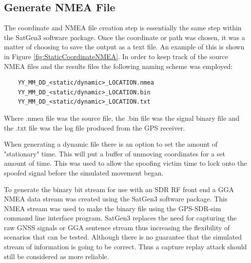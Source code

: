 \subsection{Generate NMEA File} \label{subsec:NMEAFile}
The coordinate and NMEA file creation step is essentially the same step within the SatGen3 software package. Once the coordinate or path was chosen, it was a matter of
choosing to save the output as a text file. An example of this is shown in Figure \ref{fig:StaticCoordinateNMEA}. In order to keep track of the source NMEA files and the
results files the following naming scheme was employed:
\\
\begin{verbatim}
    YY_MM_DD_<static/dynamic>_LOCATION.nmea
    YY_MM_DD_<static/dynamic>_LOCATION.bin
    YY_MM_DD_<static/dynamic>_LOCATION.txt
\end{verbatim}

Where .nmea file was the source file, the .bin file was the signal binary file and the .txt file was the log file produced from the GPS receiver.

When generating a dynamic file there is an option to set the amount of "stationary" time. This will put a buffer of unmoving coordinates for a set amount of time. This
was used to allow the spoofing victim time to lock onto the spoofed signal before the simulated movement began.

To generate the binary bit stream for use with an SDR RF front end a GGA NMEA data stream was created using the SatGen3 software package. This NMEA stream was used to make
the binary file using the GPS-SDR-sim command line interface program. SatGen3 replaces the need for capturing the raw GNSS signals or GGA sentence stream thus increasing
the flexibility of scenarios that can be tested. Although there is no guarantee that the simulated stream of information is going to be correct. Thus a capture replay
attack should still be considered as more reliable.

